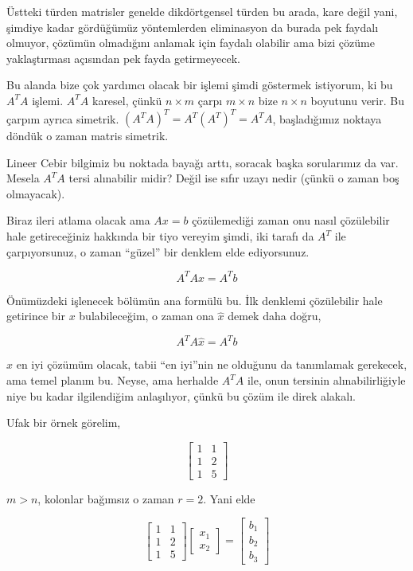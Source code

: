 \documentclass[12pt,fleqn]{article}\usepackage{../../common}
\begin{document}
Üstteki türden matrisler genelde dikdörtgensel türden bu arada, kare değil yani,
şimdiye kadar gördüğümüz yöntemlerden eliminasyon da burada pek faydalı olmuyor,
çözümün olmadığını anlamak için faydalı olabilir ama bizi çözüme yaklaştırması
açısından pek fayda getirmeyecek.

Bu alanda bize çok yardımcı olacak bir işlemi şimdi göstermek istiyorum, ki bu
$A^TA$ işlemi. $A^TA$ karesel, çünkü $n \times m$ çarpı $m\times n$ bize $n
\times n$ boyutunu verir. Bu çarpım ayrıca simetrik. $(A^TA)^T = A^T(A^T)^T =
A^TA$, başladığımız noktaya döndük o zaman matris simetrik.

Lineer Cebir bilgimiz bu noktada bayağı arttı, soracak başka sorularımız da
var. Mesela $A^TA$ tersi alınabilir midir? Değil ise sıfır uzayı nedir (çünkü o
zaman boş olmayacak).

Biraz ileri atlama olacak ama $Ax=b$ çözülemediği zaman onu nasıl çözülebilir
hale getireceğiniz hakkında bir tiyo vereyim şimdi, iki tarafı da $A^T$ ile
çarpıyorsunuz, o zaman ``güzel'' bir denklem elde ediyorsunuz.

$$ A^TAx = A^Tb $$

Önümüzdeki işlenecek bölümün ana formülü bu. İlk denklemi çözülebilir hale
getirince bir $x$ bulabileceğim, o zaman ona $\hat{x}$ demek daha doğru,

$$ A^TA\hat{x} = A^Tb $$

$\hat{x}$ en iyi çözümüm olacak, tabii ``en iyi''nin ne olduğunu da tanımlamak
gerekecek, ama temel planım bu. Neyse, ama herhalde $A^TA$ ile, onun tersinin
alınabilirliğiyle niye bu kadar ilgilendiğim anlaşılıyor, çünkü bu çözüm ile
direk alakalı.

Ufak bir örnek görelim, 

$$ 
\left[\begin{array}{rr}
1 & 1 \\
1 & 2 \\
1 & 5
\end{array}\right]
 $$

$m > n$, kolonlar bağımsız o zaman $r=2$. Yani elde

$$ 
\left[\begin{array}{rr}
1 & 1 \\
1 & 2 \\
1 & 5
\end{array}\right]
\left[\begin{array}{rr}
x_1 \\ x_2
\end{array}\right]
=
\left[\begin{array}{rr}
b_1 \\ b_2 \\ b_3
\end{array}\right]
 $$
\end{document}
